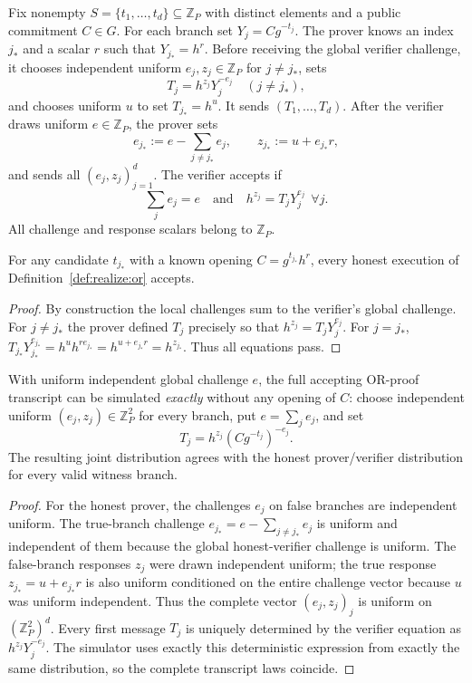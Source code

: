 \begin{definition}\label{def:realize:or}
Fix nonempty $S=\{t_1,\ldots,t_d\}\subseteq\mathbb Z_P$
with distinct elements and a public commitment $C\in G$.
For each branch set $Y_j=Cg^{-t_j}$.
The prover knows an index $j_*$ and a scalar $r$
such that $Y_{j_*}=h^r$.
Before receiving the global verifier challenge,
it chooses independent uniform
$e_j,z_j\in\mathbb Z_P$ for $j\ne j_*$,
sets
\[
 T_j=h^{z_j}Y_j^{-e_j}\quad(j\ne j_*),
\]
and chooses uniform $u$ to set $T_{j_*}=h^u$.
It sends $(T_1,\ldots,T_d)$.
After the verifier draws uniform $e\in\mathbb Z_P$,
the prover sets
\[
 e_{j_*}:=e-\sum_{j\ne j_*}e_j,\qquad
 z_{j_*}:=u+e_{j_*}r,
\]
and sends all $(e_j,z_j)_{j=1}^d$.
The verifier accepts if
\[
 \sum_j e_j=e
 \quad\text{and}\quad
 h^{z_j}=T_jY_j^{e_j}\ \ \forall j.
\]
All challenge and response scalars belong to $\mathbb Z_P$.
\end{definition}

\begin{lemma}\label{lem:realize:or-complete}
For any candidate $t_{j_*}$ with a known
opening $C=g^{t_{j_*}}h^r$, every honest
execution of Definition~\ref{def:realize:or} accepts.
\end{lemma}
\begin{proof}
By construction the local challenges sum to the
verifier's global challenge.
For $j\ne j_*$ the prover defined $T_j$ precisely so that
$h^{z_j}=T_jY_j^{e_j}$.
For $j=j_*$,
$T_{j_*}Y_{j_*}^{e_{j_*}}
=h^uh^{re_{j_*}}=h^{u+e_{j_*}r}=h^{z_{j_*}}$.
Thus all equations pass.
\end{proof}

\begin{theorem}\label{thm:realize:or-hvzk}
With uniform independent global challenge $e$,
the full accepting OR-proof transcript can be
simulated \emph{exactly} without any opening of $C$:
choose independent uniform $(e_j,z_j)\in\mathbb Z_P^2$
for every branch, put $e=\sum_j e_j$, and set
\[
 \boxed{T_j=h^{z_j}(Cg^{-t_j})^{-e_j}.}
\]
The resulting joint distribution agrees with
the honest prover/verifier distribution for
every valid witness branch.
\end{theorem}
\begin{proof}
For the honest prover, the challenges $e_j$ on
false branches are independent uniform.
The true-branch challenge
$e_{j_*}=e-\sum_{j\ne j_*}e_j$ is uniform
and independent of them because the global
honest-verifier challenge is uniform.
The false-branch responses $z_j$ were drawn
independent uniform; the true response
$z_{j_*}=u+e_{j_*}r$ is also uniform
conditioned on the entire challenge vector
because $u$ was uniform independent.
Thus the complete vector $(e_j,z_j)_j$
is uniform on $(\mathbb Z_P^2)^d$.
Every first message $T_j$ is uniquely
determined by the verifier equation as
$h^{z_j}Y_j^{-e_j}$.
The simulator uses exactly this deterministic
expression from exactly the same distribution,
so the complete transcript laws coincide.
\end{proof}

